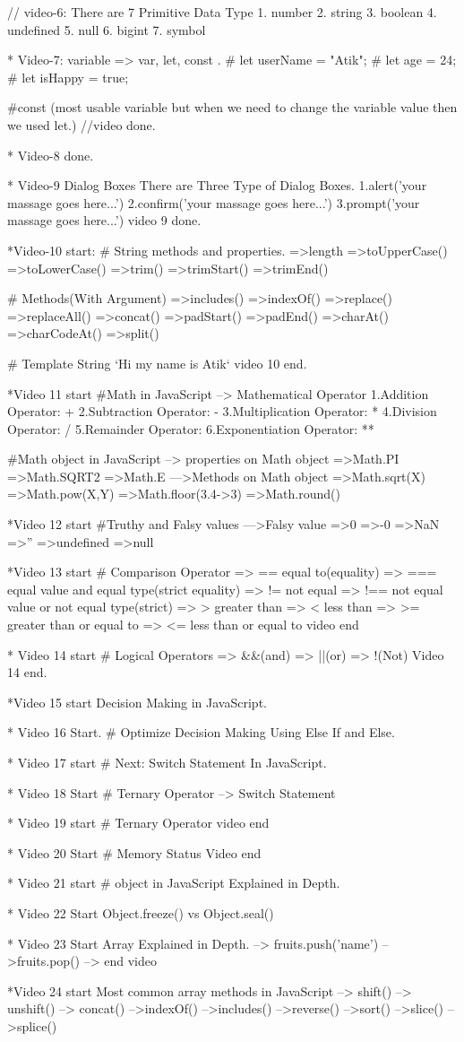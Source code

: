 // video-6: There are 7 Primitive Data Type
1. number
2. string
3. boolean
4. undefined
5. null
6. bigint
7. symbol

* Video-7: 
variable => var, let, const .
# let userName = "Atik";
# let age = 24;
# let isHappy = true;

#const (most usable variable but  when we need to change the variable value then we used let.)
//video done.

* Video-8 done.

* Video-9 
Dialog Boxes
There are Three Type of Dialog Boxes.
1.alert('your massage goes here...')
2.confirm('your massage goes here...')
3.prompt('your massage goes here...')
video 9 done.

*Video-10 start: 
# String methods and properties.
=>length
=>toUpperCase()
=>toLowerCase()
=>trim()
=>trimStart()
=>trimEnd()

# Methods(With Argument)
=>includes()
=>indexOf()
=>replace()
=>replaceAll()
=>concat()
=>padStart()
=>padEnd()
=>charAt()
=>charCodeAt()
=>split()

# Template String 
`Hi my name is Atik`
video 10 end.

*Video 11 start
#Math in JavaScript
--> Mathematical Operator
1.Addition Operator: +
2.Subtraction Operator: -
3.Multiplication Operator: *
4.Division Operator: /
5.Remainder Operator: %
6.Exponentiation Operator: **

#Math object in JavaScript
--> properties on Math object
=>Math.PI 
=>Math.SQRT2
=>Math.E
--->Methods on Math object
=>Math.sqrt(X)
=>Math.pow(X,Y)
=>Math.floor(3.4->3)
=>Math.round()

*Video 12 start
#Truthy and Falsy values
--->Falsy value
=>0
=>-0
=>NaN
=>''
=>undefined
=>null

*Video 13 start
# Comparison Operator
=> == equal to(equality)
=> === equal value and equal type(strict equality)
=> != not equal
=> !== not equal value or not equal type(strict)
=> > greater than
=> < less than
=> >= greater than or equal to 
=> <= less than or equal to
video end

* Video 14 start
# Logical Operators
=> &&(and)
=> ||(or)
=> !(Not)
Video 14 end.

*Video 15 start
Decision Making in JavaScript.

* Video 16 Start.
# Optimize Decision Making Using Else If and Else.

* Video 17 start
# Next: Switch Statement In JavaScript.

* Video 18 Start
# Ternary Operator
--> Switch Statement

* Video 19 start
# Ternary Operator
video end

* Video 20 Start
# Memory Status
 Video end

 * Video 21 start
 # object in JavaScript Explained in Depth.

 * Video 22 Start 
 Object.freeze() vs Object.seal()

 * Video 23 Start
 Array Explained in Depth.
 --> fruits.push('name')
 -->fruits.pop()
 -->
 end video

 *Video 24 start
 Most common array methods in JavaScript
 --> shift()
 --> unshift()
 --> concat()
 -->indexOf()
 -->includes()
 -->reverse()
 -->sort()
 -->slice()
 -->splice()
 